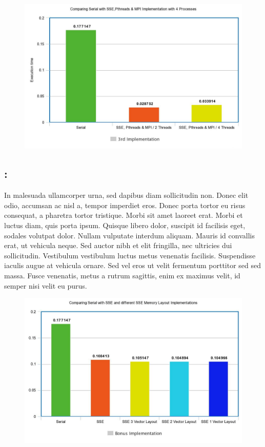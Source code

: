 \documentclass{article}
\begin{document}
\begin{figure}[h!]
\centering
  \includegraphics[width=0.8\linewidth]{MPI4.jpeg}
  \caption{ }
\end{figure}

\newpage

\subsection{: }

In malesuada ullamcorper urna, sed dapibus diam sollicitudin non. Donec elit odio, accumsan ac nisl a, tempor imperdiet eros. Donec porta tortor eu risus consequat, a pharetra tortor tristique. Morbi sit amet laoreet erat. Morbi et luctus diam, quis porta ipsum. Quisque libero dolor, suscipit id facilisis eget, sodales volutpat dolor. Nullam vulputate interdum aliquam. Mauris id convallis erat, ut vehicula neque. Sed auctor nibh et elit fringilla, nec ultricies dui sollicitudin. Vestibulum vestibulum luctus metus venenatis facilisis. Suspendisse iaculis augue at vehicula ornare. Sed vel eros ut velit fermentum porttitor sed sed massa. Fusce venenatis, metus a rutrum sagittis, enim ex maximus velit, id semper nisi velit eu purus.

\begin{figure}[h!]
\centering 
  \includegraphics[width=0.8\linewidth]{BONUS.jpeg}
  \caption{ }
\end{figure}
\end{document}
